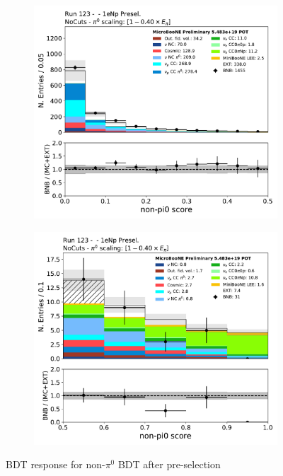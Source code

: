 \begin{figure}[H] 
\begin{center}
    \begin{subfigure}[b]{0.45\textwidth}
    \centering
    \includegraphics[width=1.00\textwidth]{1eNp/nonpi0_score_presel_low.pdf}
    \caption{\label{fig:1eNp:bdt:nonpi0:low}}
    \end{subfigure}
    \begin{subfigure}[b]{0.45\textwidth}
    \centering
    \includegraphics[width=1.00\textwidth]{1eNp/nonpi0_score_presel_high.pdf}
    \caption{\label{fig:1eNp:bdt:nonpi0:high}}
    \end{subfigure}
\caption{\label{fig:1eNp:bdt:nonpi0}BDT response for non-$\pi^0$ BDT after \npsel pre-selection}
\end{center}
\end{figure}


